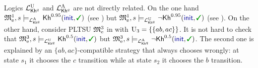 Logics ${\mathcal{L}^{\mathrm{U}}_{{\mathsf{Kh}}^q}}$ and ${\mathcal{L}^{\mathrm{A}}_{{\mathsf{Kh}}^q}}$ are not directly 
related.
%
On the one hand
$\modelex^1,s \models_\PKhadapt \kh^{0.95}(\init,\goal)$
(see ) but
$\modelex^1,s \models_\PKhunc \neg\kh^{0.95}(\init,\goal)$
(see ).
%
On the other hand, consider PLTSU ${\mathfrak{M}}_{\mathrm{e}}^3$ in 
with $\operatorname{U}_3=\{\{ab,ac\}\}$.  It is not hard to check that
$\modelex^3,s \models_\PKhunc \kh^{0.5}(\init,\goal)$ but 
$\modelex^3,s \models_\PKhadapt \neg\kh^{0.5}(\init,\goal)$.
The second one is explained by an $\{ab,ac\}$-compatible strategy that
always chooses wrongly: at state $s_1$ it chooses the $c$ transition
while at state $s_2$ it chooses the $b$ transition.


